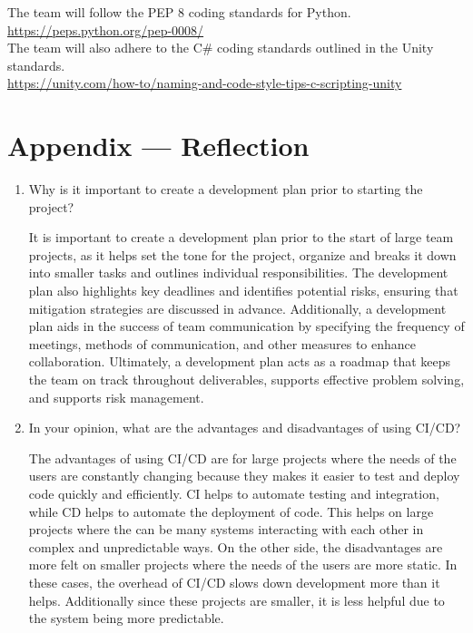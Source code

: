 \documentclass{article}
\begin{document}
The team will follow the PEP 8 coding standards for Python.
\\
\url{https://peps.python.org/pep-0008/}
\\
\noindent The team will also adhere to the C\# coding standards outlined in the Unity standards.
\\
\url{https://unity.com/how-to/naming-and-code-style-tips-c-scripting-unity}

\newpage{}

\section*{Appendix --- Reflection}



\begin{enumerate}
    \item Why is it important to create a development plan prior to starting the
    project?

    It is important to create a development plan prior to the start of large team projects, as it helps set the tone for the project, organize and breaks it down into smaller tasks and outlines individual responsibilities. 
    The development plan also highlights key deadlines and identifies potential risks, ensuring that mitigation strategies are discussed in advance.
    Additionally, a development plan aids in the success of team communication by specifying the frequency of meetings, methods of communication, and other measures to enhance collaboration.
    Ultimately, a development plan acts as a roadmap that keeps the team on track throughout deliverables, supports effective problem solving, and supports risk management.

    \item In your opinion, what are the advantages and disadvantages of using
    CI/CD?

    The advantages of using CI/CD are for large projects where the needs of the users are constantly changing because they makes it easier to test and deploy code quickly and efficiently.
    CI helps to automate testing and integration, while CD helps to automate the deployment of code.
    This helps on large projects where the can be many systems interacting with each other in complex and unpredictable ways.
    On the other side, the disadvantages are more felt on smaller projects where the needs of the users are more static.
    In these cases, the overhead of CI/CD slows down development more than it helps.
    Additionally since these projects are smaller, it is less helpful due to the system being more predictable.



\end{enumerate}
\end{document}

